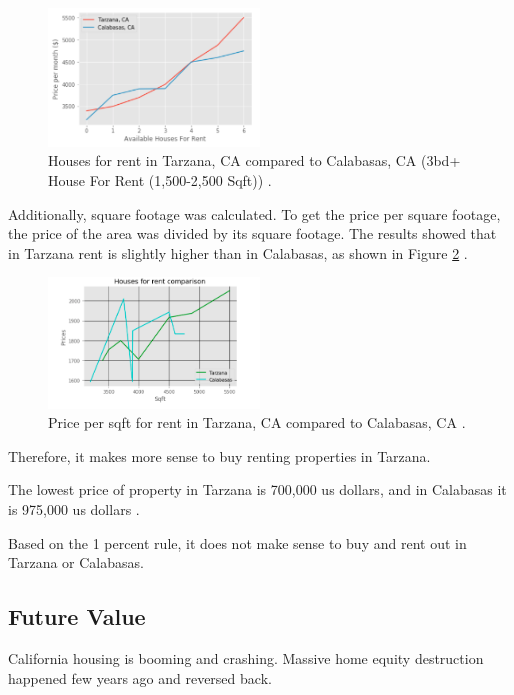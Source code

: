 \documentclass[sigconf]{acmart}
\begin{document}
\begin{figure}
  \centering
  \includegraphics[width=0.5\textwidth]{images/figure11.png}
  \caption{Houses for rent in Tarzana, CA compared to Calabasas, CA (3bd+ House For Rent (1,500-2,500 Sqft)) \cite{md}.} \label{fig:figure11} 
\end{figure}

Additionally, square footage was calculated. To get the price per square footage, the price of the area was divided by its square footage. The results showed that in Tarzana rent is slightly higher than in Calabasas, as shown in Figure \ref{fig:figure12} \cite{md}.

\begin{figure}
  \centering
  \includegraphics[width=0.5\textwidth]{images/figure12.png}
  \caption{Price per sqft for rent in Tarzana, CA compared to Calabasas, CA \cite{md}.} \label{fig:figure12} 
\end{figure}

Therefore, it makes more sense to buy renting properties in Tarzana.

The lowest price of property in Tarzana is 700,000 us dollars, and in Calabasas it is 975,000 us dollars \cite{md}.

Based on the 1 percent rule, it does not make sense to buy and rent out in Tarzana or Calabasas.

\subsection{Future Value}

California housing is booming and crashing. Massive home equity destruction happened few years ago and reversed back. 
\end{document}
